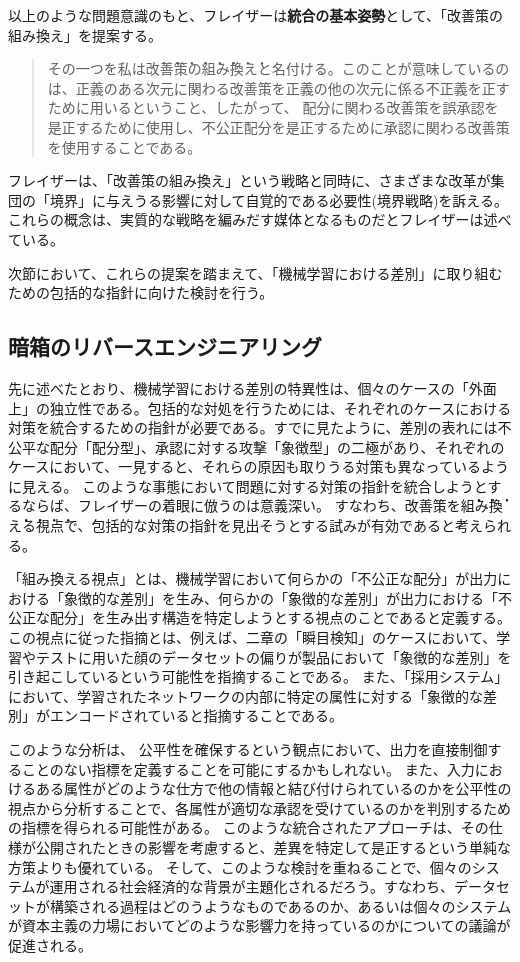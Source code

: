 \documentclass[b5j,twoside,twocolumn]{utarticle}
\begin{document}
以上のような問題意識のもと、フレイザーは\textbf{統合の基本姿勢}として、「改善策の組み換え」を提案する。
\begin{quote}
その一つを私は\.改\.善\.策\.の\.組\.み\.換\.えと名付ける。このことが意味しているのは、正義のある次元に関わる改善策を正義の他の次元に係る不正義を正すために用いるということ、したがって、
配分に関わる改善策を誤承認を是正するために使用し、不公正配分を是正するために承認に関わる改善策を使用することである。
\end{quote}
フレイザーは、「改善策の組み換え」という戦略と同時に、さまざまな改革が集団の「境界」に与えうる影響に対して自覚的である必要性(境界戦略)を訴える。これらの概念は、実質的な戦略を編みだす媒体となるものだとフレイザーは述べている。


次節において、これらの提案を踏まえて、「機械学習における差別」に取り組むための包括的な指針に向けた検討を行う。

\subsection{暗箱のリバースエンジニアリング}
先に述べたとおり、機械学習における差別の特異性は、個々のケースの「外面上」の独立性である。包括的な対処を行うためには、それぞれのケースにおける対策を統合するための指針が必要である。すでに見たように、差別の表れには不公平な配分「配分型」、承認に対する攻撃「象徴型」の二極があり、それぞれのケースにおいて、一見すると、それらの原因も取りうる対策も異なっているように見える。
このような事態において問題に対する対策の指針を統合しようとするならば、フレイザーの着眼に倣うのは意義深い。
すなわち、改善策を\.組\.み\.換\.え\.る\.視\.点で、包括的な対策の指針を見出そうとする試みが有効であると考えられる。


「組み換える視点」とは、機械学習において何らかの「不公正な配分」が出力における「象徴的な差別」を生み、何らかの「象徴的な差別」が出力における「不公正な配分」を生み出す構造を特定しようとする視点のことであると定義する。この視点に従った指摘とは、例えば、二章の「瞬目検知」のケースにおいて、学習やテストに用いた顔のデータセットの偏りが製品において「象徴的な差別」を引き起こしているという可能性を指摘することである。
また、「採用システム」において、学習されたネットワークの内部に特定の属性に対する「象徴的な差別」がエンコードされていると指摘することである。


このような分析は、
公平性を確保するという観点において、出力を直接制御することのない指標を定義することを可能にするかもしれない。
また、入力におけるある属性がどのような仕方で他の情報と結び付けられているのかを公平性の視点から分析することで、各属性が適切な承認を受けているのかを判別するための指標を得られる可能性がある。
このような統合されたアプローチは、その仕様が公開されたときの影響を考慮すると、差異を特定して是正するという単純な方策よりも優れている。
そして、このような検討を重ねることで、個々のシステムが運用される社会経済的な背景が主題化されるだろう。すなわち、データセットが構築される過程はどのうようなものであるのか、あるいは個々のシステムが資本主義の力場においてどのような影響力を持っているのかについての議論が促進される。
\end{document}
